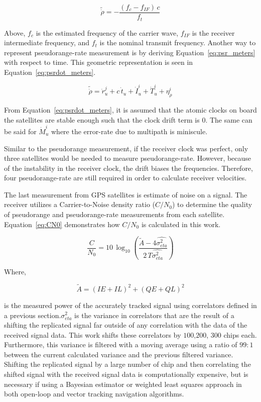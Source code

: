 \begin{equation}\label{eq:psrdot_time}
    \tilde{\dot{\rho}} = - \frac{\left(f_c - f_{IF}\right)\,c}{f_t}
\end{equation}

Above, \(f_c\) is the estimated frequency of the carrier wave, \(f_{IF}\) is the receiver intermediate frequency, and \(f_t\) is the nominal transmit frequency. Another way to represent pseudorange-rate measurement is by deriving Equation~\ref{eq:psr_meters} with respect to time. This geometric representation is seen in Equation~\ref{eq:psrdot_meters}.

\begin{equation}\label{eq:psrdot_meters}
    \tilde{\dot{\rho}} = \dot{r}_u^j + c\,\dot{t}_u + \dot{I}^i_u + \dot{T}^i_u + \eta^i_{\dot{\rho}}
\end{equation}

From Equation~\ref{eq:psrdot_meters}, it is assumed that the atomic clocks on board the satellites are stable enough such that the clock drift term is \(0\). The same can be said for \(\dot{M}^i_u\) where the error-rate due to multipath is miniscule.

Similar to the pseudorange measurement, if the receiver clock was perfect, only three satellites would be needed to measure pseudorange-rate. However, because of the instability in the receiver clock, the drift biases the frequencies. Therefore, four pseudorange-rate are still required in order to calculate receiver velocities.

The last measurement from GPS satellites is estimate of noise on a signal. The receiver utilizes a Carrier-to-Noise density ratio (\(C/N_0\)) to determine the quality of pseudorange and pseudorange-rate measurements from each satellite. Equation~\ref{eq:CN0} demonstrates how \(C/N_0\) is calculated in this work.

\begin{equation}\label{eq:CN0}
    \frac{C}{N_0} = 10\,\log_{10} {\left(\frac{\tilde{A} - 4\hat{\sigma_{eta}^2}}{2\,T\hat{\sigma_{eta}^2}}\right)}
\end{equation}

Where,

\begin{equation}\label{eq:ampitude}
    \tilde{A} = {\left(IE +IL\right)}^2 + {\left(QE + QL\right)}^2
\end{equation}

is the measured power of the accurately tracked signal using correlators defined in a previous section.\(\sigma_{eta}^2\) is the variance in correlators that are the result of a shifting the replicated signal far outside of any correlation with the data of the received signal data. This work shifts these correlators by \(100\),\(200\), \(300\) chips each. Furthermore, this variance is filtered with a moving average using a ratio of \(99:1\) between the current calculated variance and the previous filtered variance. Shifting the replicated signal by a large number of chip and then correlating the shifted signal with the received signal data is computationally expensive, but is necessary if using a Bayesian estimator or weighted least squares approach in both open-loop and vector tracking navigation algorithms.



